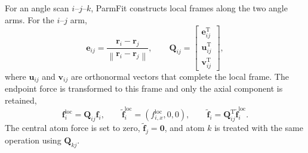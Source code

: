 For an angle scan $i$--$j$--$k$, ParmFit constructs local frames along the two angle arms. For the $i$--$j$ arm,
\begin{equation}
\mathbf{e}_{ij}=
\frac{\mathbf{r}_i-\mathbf{r}_j}
{\left\|\mathbf{r}_i-\mathbf{r}_j\right\|},
\qquad
\mathbf{Q}_{ij}=
\begin{bmatrix}
\mathbf{e}_{ij}^{\mathrm{T}}\\
\mathbf{u}_{ij}^{\mathrm{T}}\\
\mathbf{v}_{ij}^{\mathrm{T}}
\end{bmatrix},
\end{equation}
where $\mathbf{u}_{ij}$ and $\mathbf{v}_{ij}$ are orthonormal vectors that complete the local frame. The endpoint force is transformed to this frame and only the axial component is retained,
\begin{equation}
\mathbf{f}^{\mathrm{loc}}_i=\mathbf{Q}_{ij}\mathbf{f}_i,
\qquad
\widetilde{\mathbf{f}}^{\mathrm{loc}}_i
=
\left(f^{\mathrm{loc}}_{i,x},0,0\right),
\qquad
\widetilde{\mathbf{f}}_i=
\mathbf{Q}_{ij}^{\mathrm{T}}
\widetilde{\mathbf{f}}^{\mathrm{loc}}_i .
\end{equation}
The central atom force is set to zero, $\widetilde{\mathbf{f}}_j=\mathbf{0}$, and atom $k$ is treated with the same operation using $\mathbf{Q}_{kj}$.

